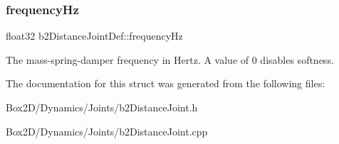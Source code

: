 \subsubsection{\texorpdfstring{frequency\+Hz}{frequencyHz}}
{\footnotesize\ttfamily float32 b2\+Distance\+Joint\+Def\+::frequency\+Hz}

The mass-\/spring-\/damper frequency in Hertz. A value of 0 disables softness. 

The documentation for this struct was generated from the following files\+:\begin{DoxyCompactItemize}
\item 
Box2\+D/\+Dynamics/\+Joints/b2\+Distance\+Joint.\+h\item 
Box2\+D/\+Dynamics/\+Joints/b2\+Distance\+Joint.\+cpp\end{DoxyCompactItemize}
